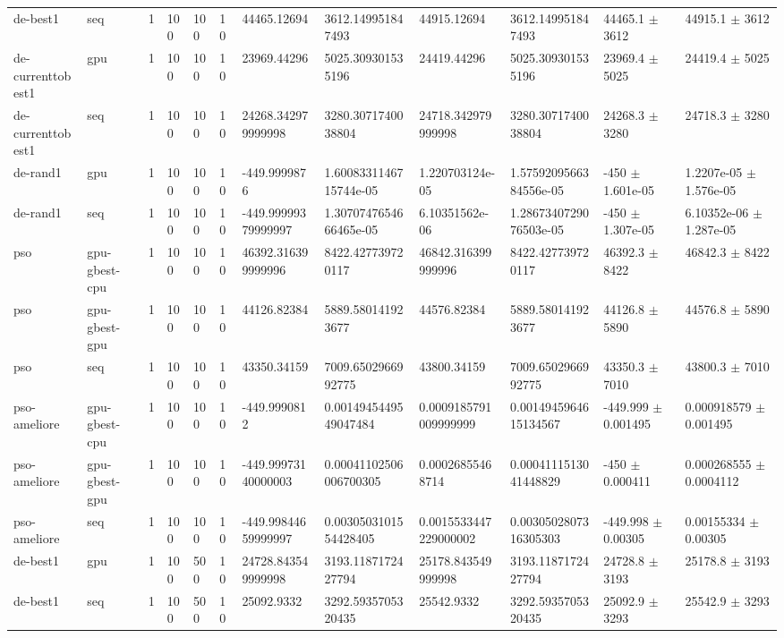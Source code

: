 \begin{table}[t]
\begin{tabular}{llllllllllll}
de-best1 & seq & 1 & 100 & 100 & 10 & 44465.12694 & 3612.149951847493 & 44915.12694 & 3612.149951847493 & 44465.1 $\pm$ 3612 & 44915.1 $\pm$ 3612 \\
de-currenttobest1 & gpu & 1 & 100 & 100 & 10 & 23969.44296 & 5025.309301535196 & 24419.44296 & 5025.309301535196 & 23969.4 $\pm$ 5025 & 24419.4 $\pm$ 5025 \\
de-currenttobest1 & seq & 1 & 100 & 100 & 10 & 24268.342979999998 & 3280.3071740038804 & 24718.342979999998 & 3280.3071740038804 & 24268.3 $\pm$ 3280 & 24718.3 $\pm$ 3280 \\
de-rand1 & gpu & 1 & 100 & 100 & 10 & -449.9999876 & 1.6008331146715744e-05 & 1.220703124e-05 & 1.5759209566384556e-05 & -450 $\pm$ 1.601e-05 & 1.2207e-05 $\pm$ 1.576e-05 \\
de-rand1 & seq & 1 & 100 & 100 & 10 & -449.99999379999997 & 1.3070747654666465e-05 & 6.10351562e-06 & 1.2867340729076503e-05 & -450 $\pm$ 1.307e-05 & 6.10352e-06 $\pm$ 1.287e-05 \\
pso & gpu-gbest-cpu & 1 & 100 & 100 & 10 & 46392.316399999996 & 8422.427739720117 & 46842.316399999996 & 8422.427739720117 & 46392.3 $\pm$ 8422 & 46842.3 $\pm$ 8422 \\
pso & gpu-gbest-gpu & 1 & 100 & 100 & 10 & 44126.82384 & 5889.580141923677 & 44576.82384 & 5889.580141923677 & 44126.8 $\pm$ 5890 & 44576.8 $\pm$ 5890 \\
pso & seq & 1 & 100 & 100 & 10 & 43350.34159 & 7009.6502966992775 & 43800.34159 & 7009.6502966992775 & 43350.3 $\pm$ 7010 & 43800.3 $\pm$ 7010 \\
pso-ameliore & gpu-gbest-cpu & 1 & 100 & 100 & 10 & -449.9990812 & 0.0014945449549047484 & 0.0009185791009999999 & 0.0014945964615134567 & -449.999 $\pm$ 0.001495 & 0.000918579 $\pm$ 0.001495 \\
pso-ameliore & gpu-gbest-gpu & 1 & 100 & 100 & 10 & -449.99973140000003 & 0.00041102506006700305 & 0.00026855468714 & 0.0004111513041448829 & -450 $\pm$ 0.000411 & 0.000268555 $\pm$ 0.0004112 \\
pso-ameliore & seq & 1 & 100 & 100 & 10 & -449.99844659999997 & 0.0030503101554428405 & 0.0015533447229000002 & 0.0030502807316305303 & -449.998 $\pm$ 0.00305 & 0.00155334 $\pm$ 0.00305 \\
de-best1 & gpu & 1 & 100 & 500 & 10 & 24728.843549999998 & 3193.1187172427794 & 25178.843549999998 & 3193.1187172427794 & 24728.8 $\pm$ 3193 & 25178.8 $\pm$ 3193 \\
de-best1 & seq & 1 & 100 & 500 & 10 & 25092.9332 & 3292.5935705320435 & 25542.9332 & 3292.5935705320435 & 25092.9 $\pm$ 3293 & 25542.9 $\pm$ 3293 \\

\end{tabular}
\end{table}
